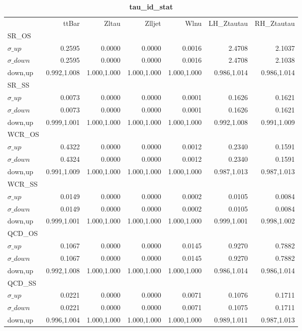\documentclass[11pt,oneside,a4paper]{article}
\begin{document}
\begin{table}
\centering
\caption{\bf{tau\_id\_stat}}
\begin{tabular}{lrrrrrr}
 & ttBar & Zltau & Zlljet & Wlnu & LH\_Ztautau & RH\_Ztautau \\
SR\_OS &  &  &  &  &  &  \\
$\sigma\_up$ & 0.2595 & 0.0000 & 0.0000 & 0.0016 & 2.4708 & 2.1037 \\
$\sigma\_down$ & 0.2595 & 0.0000 & 0.0000 & 0.0016 & 2.4708 & 2.1038 \\
down,up & 0.992,1.008 & 1.000,1.000 & 1.000,1.000 & 1.000,1.000 & 0.986,1.014 & 0.986,1.014 \\

\hline
SR\_SS &  &  &  &  &  &  \\
$\sigma\_up$ & 0.0073 & 0.0000 & 0.0000 & 0.0001 & 0.1626 & 0.1621 \\
$\sigma\_down$ & 0.0073 & 0.0000 & 0.0000 & 0.0001 & 0.1626 & 0.1621 \\
down,up & 0.999,1.001 & 1.000,1.000 & 1.000,1.000 & 1.000,1.000 & 0.992,1.008 & 0.991,1.009 \\

\hline
WCR\_OS &  &  &  &  &  &  \\
$\sigma\_up$ & 0.4322 & 0.0000 & 0.0000 & 0.0012 & 0.2340 & 0.1591 \\
$\sigma\_down$ & 0.4324 & 0.0000 & 0.0000 & 0.0012 & 0.2340 & 0.1591 \\
down,up & 0.991,1.009 & 1.000,1.000 & 1.000,1.000 & 1.000,1.000 & 0.987,1.013 & 0.987,1.013 \\

\hline
WCR\_SS &  &  &  &  &  &  \\
$\sigma\_up$ & 0.0149 & 0.0000 & 0.0000 & 0.0002 & 0.0105 & 0.0084 \\
$\sigma\_down$ & 0.0149 & 0.0000 & 0.0000 & 0.0002 & 0.0105 & 0.0084 \\
down,up & 0.999,1.001 & 1.000,1.000 & 1.000,1.000 & 1.000,1.000 & 0.999,1.001 & 0.998,1.002 \\

\hline
QCD\_OS &  &  &  &  &  &  \\
$\sigma\_up$ & 0.1067 & 0.0000 & 0.0000 & 0.0145 & 0.9270 & 0.7882 \\
$\sigma\_down$ & 0.1067 & 0.0000 & 0.0000 & 0.0145 & 0.9270 & 0.7882 \\
down,up & 0.992,1.008 & 1.000,1.000 & 1.000,1.000 & 1.000,1.000 & 0.986,1.014 & 0.986,1.014 \\

\hline
QCD\_SS &  &  &  &  &  &  \\
$\sigma\_up$ & 0.0221 & 0.0000 & 0.0000 & 0.0071 & 0.1076 & 0.1711 \\
$\sigma\_down$ & 0.0221 & 0.0000 & 0.0000 & 0.0071 & 0.1075 & 0.1711 \\
down,up & 0.996,1.004 & 1.000,1.000 & 1.000,1.000 & 1.000,1.000 & 0.989,1.011 & 0.987,1.013 \\

\hline
\end{tabular}
\end{table}
\end{document}
